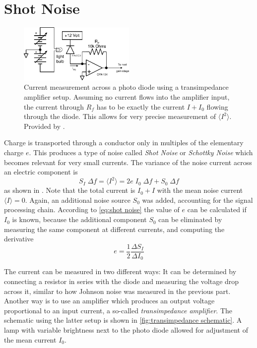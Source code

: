 \documentclass[
    parskip=half, 
    twoside=false,
    twocolumn=true,
    fontsize=11pt,
]{scrarticle}
\begin{document}
\section{Shot Noise}
\begin{figure}
    \centering
    \includegraphics[width=0.5\textwidth]{figures/tamp_schematic.pdf}
    \caption{
        Current measurement across a photo diode using a transimpedance amplifier setup. Assuming no current flows into the amplifier input, the current through $R_f$ has to be exactly the current $I + I_0$ flowing through the diode. This allows for very precise measurement of $\langle I^2 \rangle$.
        Provided by \autocite{instructions}.
    }
    \label{fig:transimpedance schematic}
\end{figure}
Charge is transported through a conductor only in multiples of the elementary charge $e$. This produces a type of noise called \textit{Shot Noise} or \textit{Schottky Noise} which becomes relevant for very small currents. The variance of the noise current across an electric component is
\begin{equation}
    \label{eq:shot noise}
    S_I\;\Delta f = \langle I^2 \rangle = 2 e\; I_0\; \Delta f + S_0\;\Delta f
\end{equation}
as shown in \autocite{Buch}. Note that the total current is $I_0 + I$ with the mean noise current $\langle I \rangle = 0$. Again, an additional noise source $S_0$ was added, accounting for the signal processing chain. According to \autoref{eq:shot noise} the value of $e$ can be calculated if $I_0$ is known, because the additional component $S_0$ can be eliminated by measuring the same component at different currents, and computing the derivative
\begin{equation}
 e = \frac{1}{2}\frac{\Delta S_I}{\Delta I_0}
\end{equation}

The current can be measured in two different ways: 
It can be determined by connecting a resistor in series with the diode and measuring the voltage drop across it, similar to how Johnson noise was measured in the previous part. 
Another way is to use an amplifier which produces an output voltage proportional to an input current, a so-called \textit{transimpedance amplifier}.
The schematic using the latter setup is shown in \autoref{fig:transimpedance schematic}. A lamp with variable brightness next to the photo diode allowed for adjustment of the mean current $I_0$.
\end{document}
